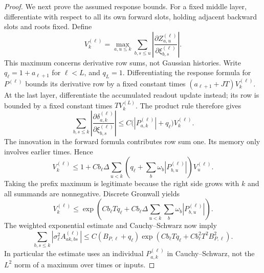 \begin{proof}
We next prove the assumed response bounds.  For a fixed middle layer,
differentiate with respect to all its own forward slots, holding adjacent
backward slots and roots fixed.  Define
\[
 V_k^{(\ell)}=
 \max_{a,u\le k}
 \sum_{b,s\le u}
 \left|\frac{\partial Z_{a,u}^{(\ell)}}
                  {\partial\xi_{b,s}^{(\ell)}}\right|.
\]
This maximum concerns derivative row sums, not Gaussian histories.
Write $q_\ell=1+a_{\ell+1}$ for $\ell<L$, and $q_L=1$.
Differentiating the response formula for $P^{(\ell)}$ bounds its
derivative row by a fixed constant times
$(a_{\ell+1}+JT)V_k^{(\ell)}$.  At the last layer, differentiate the
accumulated readout update instead; its row is bounded by a fixed
constant times $TV_k^{(L)}$.  The product rule therefore gives
\[
 \sum_{b,s\le k}
 \left|\frac{\partial\delta_{a,k}^{(\ell)}}
                  {\partial\xi_{b,s}^{(\ell)}}\right|
 \le C\bigl(|P_{a,k}^{(\ell)}|+q_\ell\bigr)V_k^{(\ell)}.
\]
The innovation in the forward formula contributes row sum one.  Its
memory only involves earlier times.  Hence
\[
 V_k^{(\ell)}\le1+
 Cb_\ell\Delta\sum_{u<k}
 \left(q_\ell+\sum_b\omega_b|P_{b,u}^{(\ell)}|\right)V_u^{(\ell)}.
\]
Taking the prefix maximum is legitimate because the right side grows
with $k$ and all summands are nonnegative.  Discrete Gronwall yields
\[
 V_k^{(\ell)}\le
 \exp\!\left(Cb_\ell Tq_\ell+
 Cb_\ell\Delta\sum_{u<k}\sum_b\omega_b|P_{b,u}^{(\ell)}|\right).
\]
The weighted exponential estimate and Cauchy--Schwarz now imply
\begin{equation}
 \sum_{b,s\le k}|\sigma_\ell^2A_{ak,bs}^{(\ell)}|
 \le C(B_{P,\ell}+q_\ell)
 \exp\!\left(Cb_\ell Tq_\ell+
                    Cb_\ell^2T^2B_{P,\ell}^2\right).
 \label{eq:app-A-bound}
\end{equation}
In particular the estimate uses an individual $P_{a,k}^{(\ell)}$ in
Cauchy--Schwarz, not the $L^2$ norm of a maximum over times or inputs.


\end{proof}
